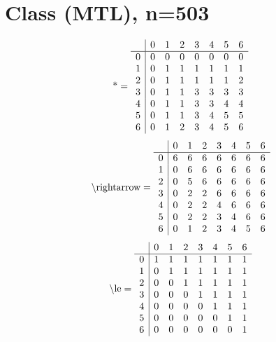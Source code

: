 \documentclass[11pt]{article}
\begin{document}
\section{Class (MTL), n=503}
\[\text{*} = 
\begin{array}{r | r r r r r r r}
 & 0 & 1 & 2 & 3 & 4 & 5 & 6 \\ \hline
0 & 0 & 0 & 0 & 0 & 0 & 0 & 0 \\
1 & 0 & 1 & 1 & 1 & 1 & 1 & 1 \\
2 & 0 & 1 & 1 & 1 & 1 & 1 & 2 \\
3 & 0 & 1 & 1 & 3 & 3 & 3 & 3 \\
4 & 0 & 1 & 1 & 3 & 3 & 4 & 4 \\
5 & 0 & 1 & 1 & 3 & 4 & 5 & 5 \\
6 & 0 & 1 & 2 & 3 & 4 & 5 & 6 \\
\end{array}
\]
\[\text{\textbackslash rightarrow} = 
\begin{array}{r | r r r r r r r}
 & 0 & 1 & 2 & 3 & 4 & 5 & 6 \\ \hline
0 & 6 & 6 & 6 & 6 & 6 & 6 & 6 \\
1 & 0 & 6 & 6 & 6 & 6 & 6 & 6 \\
2 & 0 & 5 & 6 & 6 & 6 & 6 & 6 \\
3 & 0 & 2 & 2 & 6 & 6 & 6 & 6 \\
4 & 0 & 2 & 2 & 4 & 6 & 6 & 6 \\
5 & 0 & 2 & 2 & 3 & 4 & 6 & 6 \\
6 & 0 & 1 & 2 & 3 & 4 & 5 & 6 \\
\end{array}
\]
\[\text{\textbackslash le} = 
\begin{array}{r | r r r r r r r}
 & 0 & 1 & 2 & 3 & 4 & 5 & 6 \\ \hline
0 & 1 & 1 & 1 & 1 & 1 & 1 & 1 \\
1 & 0 & 1 & 1 & 1 & 1 & 1 & 1 \\
2 & 0 & 0 & 1 & 1 & 1 & 1 & 1 \\
3 & 0 & 0 & 0 & 1 & 1 & 1 & 1 \\
4 & 0 & 0 & 0 & 0 & 1 & 1 & 1 \\
5 & 0 & 0 & 0 & 0 & 0 & 1 & 1 \\
6 & 0 & 0 & 0 & 0 & 0 & 0 & 1 \\
\end{array}
\]
\end{document}
